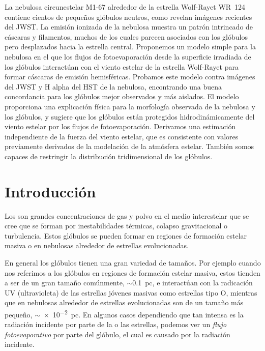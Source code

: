 \documentclass{book}
\begin{document}
La nebulosa circunestelar M1-67 alrededor de la estrella Wolf-Rayet WR~124 contiene cientos de pequeños glóbulos neutros, como revelan imágenes recientes del JWST. La emisión ionizada de la nebulosa muestra un patrón intrincado de cáscaras y filamentos, muchos de los cuales parecen asociados con los glóbulos pero desplazados hacia la estrella central. Proponemos un modelo simple para la nebulosa en el que los flujos de fotoevaporación desde la superficie irradiada de los glóbulos interactúan con el viento estelar de la estrella Wolf-Rayet para formar cáscaras de emisión hemisféricas. Probamos este modelo contra imágenes del JWST y H alpha del HST de la nebulosa, encontrando una buena concordancia para los glóbulos mejor observados y más aislados. El modelo proporciona una explicación física para la morfología observada de la nebulosa y los glóbulos, y sugiere que los glóbulos están protegidos hidrodinámicamente del viento estelar por los flujos de fotoevaporación. Derivamos una estimación independiente de la fuerza del viento estelar, que es consistente con valores previamente derivados de la modelación de la atmósfera estelar. También somos capaces de restringir la distribución tridimensional de los glóbulos.

\newpage

\tableofcontents

\newpage

\chapter{Introducción}

Los  son grandes concentraciones de gas y polvo en el medio interestelar que se cree que se forman por inestabilidades térmicas, colapso gravitacional o turbulencia. Estos glóbulos se pueden formar en regiones de formación estelar masiva o en nebulosas alrededor de estrellas evolucionadas.

En general los glóbulos tienen una gran variedad de tamaños. Por ejemplo cuando nos referimos a los glóbulos en regiones de formación estelar masiva, estos tienden a ser de un gran tamaño comúnmente, $\sim$\SI{0.1}{pc}, e interactúan con la radicación UV (ultravioleta) de las estrellas jóvenes masivas como estrellas tipo O, mientras que en nebulosas alrededor de estrellas evolucionadas son de un tamaño más pequeño, $\sim$\SI{e-2}{pc}. En algunos casos dependiendo que tan intensa es la radiación incidente por parte de la o las estrellas, podemos ver un \textit{flujo fotoevaporativo} por parte del glóbulo, el cual es causado por la radiación incidente.
\end{document}
